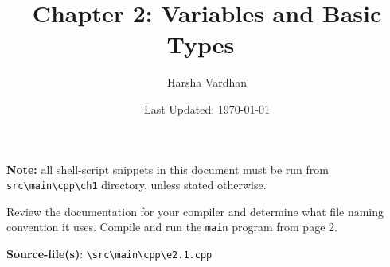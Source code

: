 \documentclass[12pt, a4paper]{article}
\begin{document}
    \title{Chapter 2: Variables and Basic Types~\cite{cpp-primer}}
    \author{Harsha Vardhan}
    \date{Last Updated: \today}

    \maketitle
    \bigskip

    \noindent\textbf{Note:} all shell-script snippets in this document must be run from \texttt{src\textbackslash main\textbackslash cpp\textbackslash ch1} directory, unless stated otherwise.
    \bigskip

    \begin{tcolorbox}[title={Exercise: 2.1}]
        Review the documentation for your compiler and determine what file naming convention it uses.
        Compile and run the \texttt{main} program from page 2.
    \end{tcolorbox}
    \noindent\textbf{Source-file(s)}: \texttt{\textbackslash src\textbackslash main\textbackslash cpp\textbackslash e2.1.cpp}
\end{document}

